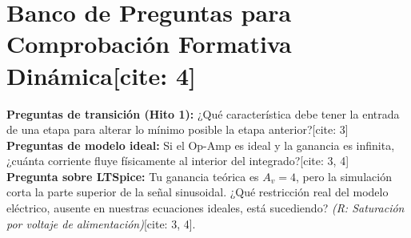 \documentclass[11pt, a4paper]{article}
\begin{document}
\section*{Banco de Preguntas para Comprobación Formativa Dinámica[cite: 4]}
\begin{tcolorbox}[colback=white, colframe=black, boxrule=0.5pt]
    \textbf{Preguntas de transición (Hito 1):} ¿Qué característica debe tener la entrada de una etapa para alterar lo mínimo posible la etapa anterior?[cite: 3] \\
    \textbf{Preguntas de modelo ideal:} Si el Op-Amp es ideal y la ganancia es infinita, ¿cuánta corriente fluye físicamente al interior del integrado?[cite: 3, 4] \\
    \textbf{Pregunta sobre LTSpice:} Tu ganancia teórica es $A_v=4$, pero la simulación corta la parte superior de la señal sinusoidal. ¿Qué restricción real del modelo eléctrico, ausente en nuestras ecuaciones ideales, está sucediendo? \textit{(R: Saturación por voltaje de alimentación)}[cite: 3, 4].
\end{tcolorbox}
\end{document}
